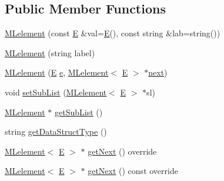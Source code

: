 \subsection*{Public Member Functions}
\begin{DoxyCompactItemize}
\item 
\mbox{\hyperlink{classbridges_1_1_m_lelement_a5d0e64b99abf4d1ad1d2cc89ca28343c}{M\+Lelement}} (const \mbox{\hyperlink{namespacebridges_acfb0a4f7877d8f63de3e6862004c50eda3a3ea00cfc35332cedf6e5e9a32e94da}{E}} \&val=\mbox{\hyperlink{namespacebridges_acfb0a4f7877d8f63de3e6862004c50eda3a3ea00cfc35332cedf6e5e9a32e94da}{E}}(), const string \&lab=string())
\item 
\mbox{\hyperlink{classbridges_1_1_m_lelement_ade42b08d96030f1ed5b92c5613d5cedd}{M\+Lelement}} (string label)
\item 
\mbox{\hyperlink{classbridges_1_1_m_lelement_aaab4924754f94138bb110efd4c047411}{M\+Lelement}} (\mbox{\hyperlink{namespacebridges_acfb0a4f7877d8f63de3e6862004c50eda3a3ea00cfc35332cedf6e5e9a32e94da}{E}} \mbox{\hyperlink{namespacebridges_acfb0a4f7877d8f63de3e6862004c50edae1671797c52e15f763380b45e841ec32}{e}}, \mbox{\hyperlink{classbridges_1_1_m_lelement}{M\+Lelement}}$<$ \mbox{\hyperlink{namespacebridges_acfb0a4f7877d8f63de3e6862004c50eda3a3ea00cfc35332cedf6e5e9a32e94da}{E}} $>$ $\ast$\mbox{\hyperlink{classbridges_1_1_s_lelement_ad7449d10a09ebc52653a7baed812aa43}{next}})
\item 
void \mbox{\hyperlink{classbridges_1_1_m_lelement_ad436f6424e7542ac92df93509f16c7e7}{set\+Sub\+List}} (\mbox{\hyperlink{classbridges_1_1_m_lelement}{M\+Lelement}}$<$ \mbox{\hyperlink{namespacebridges_acfb0a4f7877d8f63de3e6862004c50eda3a3ea00cfc35332cedf6e5e9a32e94da}{E}} $>$ $\ast$sl)
\item 
\mbox{\hyperlink{classbridges_1_1_m_lelement}{M\+Lelement}} $\ast$ \mbox{\hyperlink{classbridges_1_1_m_lelement_a55f82b59284e22caef23959e023614cc}{get\+Sub\+List}} ()
\item 
string \mbox{\hyperlink{classbridges_1_1_m_lelement_a49e5d132e80531f005e1d2da666f0c39}{get\+Data\+Struct\+Type}} ()
\item 
\mbox{\hyperlink{classbridges_1_1_m_lelement}{M\+Lelement}}$<$ \mbox{\hyperlink{namespacebridges_acfb0a4f7877d8f63de3e6862004c50eda3a3ea00cfc35332cedf6e5e9a32e94da}{E}} $>$ $\ast$ \mbox{\hyperlink{classbridges_1_1_m_lelement_aceebd292e7d497f44eea5c4845e7709f}{get\+Next}} () override
\item 
\mbox{\hyperlink{classbridges_1_1_m_lelement}{M\+Lelement}}$<$ \mbox{\hyperlink{namespacebridges_acfb0a4f7877d8f63de3e6862004c50eda3a3ea00cfc35332cedf6e5e9a32e94da}{E}} $>$ $\ast$ \mbox{\hyperlink{classbridges_1_1_m_lelement_aef3e5750e334331597bce94710745d1e}{get\+Next}} () const override

\end{DoxyCompactItemize}
